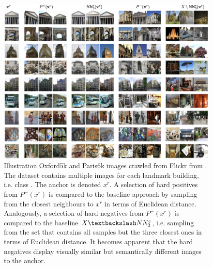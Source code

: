\begin{figure}[!htb] %
    \centering
    \includegraphics[width=360pt]{images/mining_manifold_examples.png}
    \caption{Illustration Oxford5k and Paris6k images crawled from Flickr from \citet{mining_manifolds_2018}.
    The dataset contains multiple images for each landmark building, i.e. class \citep{manifold_dataset}.
    The anchor is denoted $x^r$.
    A selection of hard positives from $P^+(x^r)$ is compared to the 
    baseline approach by sampling from the closest neighbours to $x^r$ in 
    terms of Euclidean distance.
    Analogously, a selection of hard negatives from $P^-(x^r)$ 
    is compared to the baseline $X \textbackslash NN^e_3$, 
    i.e. sampling from the set that contains all samples but the three closest ones in 
    terms of Euclidean distance.
    It becomes apparent that the hard negatives display visually similar but 
    semantically different images to the anchor. %
    }
    \label{fig:manifold_mining_examples}
\end{figure}